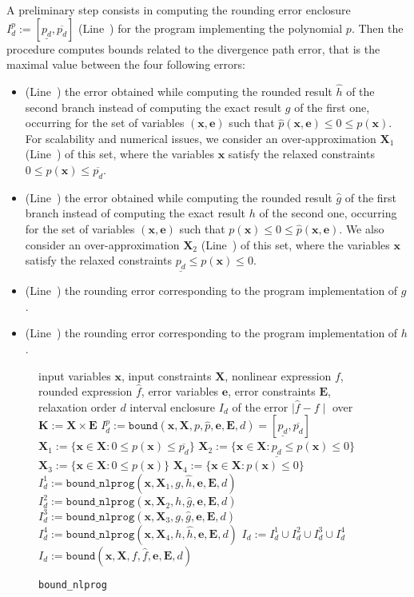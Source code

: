 \documentclass[preprint]{sigplanconf}
\newcommand{\code}[1]{\lstinline{#1}}
\newcommand{\x}{\mathbf{x}}
\newcommand{\e}{\mathbf{e}}
\def\E{\mathbf{E}}
\def\K{\mathbf{K}}
\def\X{\mathbf{X}}
\newcommand{\boundfun}[7]{\mathtt{bound}(#1, #2, #3, #4, #5, #6, #7)}
\newcommand{\boundnlprogfun}[7]{\mathtt{bound\_nlprog}(#1, #2, #3, #4, #5, #6, #7)}
\theoremstyle{plain}
\begin{document}
A preliminary step consists in computing the rounding error enclosure $I_d^p := [\underline{p_d}, \overline{p_d}]$ (Line~) for the program implementing the polynomial $p$. 
Then the procedure computes bounds related to the divergence path error, that is the maximal value between the four following errors: 
\begin{itemize}
\item (Line~) the error obtained while computing the rounded result $\hat{h}$ of the second branch instead of computing the exact result $g$ of the first one, occurring for the set of variables $(\x,\e)$ such that $\hat{p}(\x,\e) \leq 0 \leq p(\x)$. For scalability and numerical issues, we consider an over-approximation $\X_1$ (Line~) of this set, where the variables $\x$ satisfy the relaxed constraints $0 \leq p(\x) \leq \overline{p_d}$.
\item (Line~) the error obtained while computing the rounded result $\hat{g}$ of the first branch instead of computing the exact result $h$ of the second one, occurring for the set of variables $(\x,\e)$ such that $p(\x) \leq 0 \leq \hat{p}(\x,\e)$. We also consider an over-approximation $\X_2$ (Line~) of this set, where the variables $\x$ satisfy the relaxed constraints $\underline{p_d} \leq p(\x) \leq 0$.
\item (Line~) the rounding error corresponding to the program implementation of $g$.
\item(Line~) the rounding error corresponding to the program implementation of $h$.
\end{itemize}
%
\begin{figure}[!ht]
\begin{algorithmic}[1]
\Require input variables $\x$, input constraints $\X$, nonlinear expression $f$, rounded expression $\hat{f}$, error variables $\e$, error constraints $\E$, relaxation order $d$
\Ensure interval enclosure $I_d$ of the error $\mid \hat{f} - f  \mid$ over $\K := \X \times \E$
%
 \label{line:cnd}
\State $I_d^p := \boundfun{\x}{\X}{p}{\hat{p}}{\e}{\E}{d} = [\underline{p_d}, \overline{p_d}]$ \label{line:polcnd}
\State $\X_1 := \{ \x \in \X : 0 \leq p(\x) \leq \overline{p_d} \}$ \label{line:X1}
\State $\X_2 := \{ \x \in \X : \underline{p_d} \leq p(\x) \leq 0 \}$\label{line:X2}
\State $\X_3 := \{ \x \in \X : 0 \leq p(\x) \}$\label{line:X3}
\State $\X_4 := \{ \x \in \X : p(\x) \leq 0 \}$\label{line:X4}
\State $I_d^1 := \boundnlprogfun{\x}{\X_1}{g}{\hat{h}}{\e}{\E}{d}$\label{line:I1}
\State $I_d^2 := \boundnlprogfun{\x}{\X_2}{h}{\hat{g}}{\e}{\E}{d}$\label{line:I2}
\State $I_d^3 := \boundnlprogfun{\x}{\X_3}{g}{\hat{g}}{\e}{\E}{d}$\label{line:I3}
\State $I_d^4 := \boundnlprogfun{\x}{\X_4}{h}{\hat{h}}{\e}{\E}{d}$\label{line:I4}
\State \Return $I_d := I_d^1 \cup I_d^2 \cup I_d^3 \cup I_d^4$ \label{line:endcnd}
\Else \State \Return $I_d := \boundfun{\x}{\X}{f}{\hat{f}}{\e}{\E}{d}$ \label{line:noncnd}
\EndIf
%
\end{algorithmic}
\caption{\code{bound_nlprog}}
\label{alg:bound_nlprog}
\end{figure}
%
\end{document}
